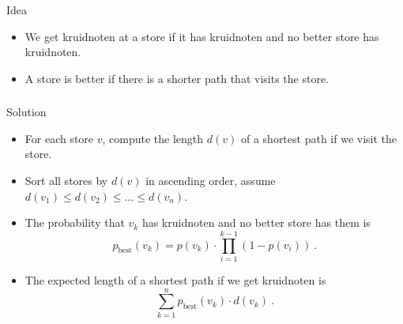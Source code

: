 \begin{frame}
\begin{figure}
    \end{figure}
    \begin{block}{Idea}
        \begin{itemize}
            \item We get kruidnoten at a store if it has kruidnoten and no better store has kruidnoten.
            \item A store is better if there is a shorter path that visits the store.
        \end{itemize}
    \end{block}
\end{frame}

\begin{frame}
    \frametitle{\problemtitle}
    \begin{block}{Solution}
        \begin{itemize}
            \item<1-> For each store $v$, compute the length $d(v)$ of a shortest path if we visit the store.
            \item<2-> Sort all stores by $d(v)$ in ascending order, assume $d(v_1) \leq d(v_2) \leq \ldots \leq d(v_n)$.
            \item<3-> The probability that $v_k$ has kruidnoten and no better store has them is $$p_\text{best}(v_k) = p(v_k) \cdot \prod_{i = 1}^{k - 1} (1 - p(v_i))~.$$
            \item<4-> The expected length of a shortest path if we get kruidnoten is $$\sum_{k=1}^{n} p_\text{best}(v_k) \cdot d(v_k)~.$$
        \end{itemize}
    \end{block}
\end{frame}
